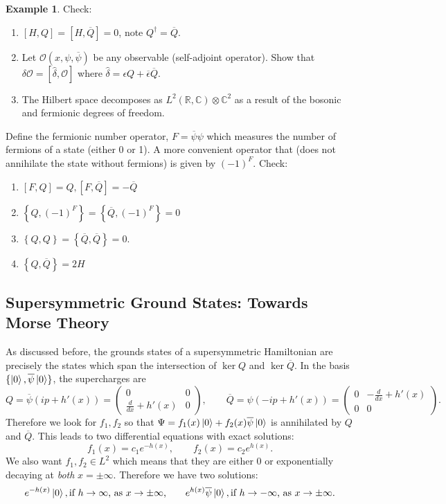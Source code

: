 \documentclass{report}
\theoremstyle{plain}
\theoremstyle{definition}
\newtheorem{example}[theorem]{Example}
\theoremstyle{remark}
\newcommand{\bC}{\mathbb{C}}
\newcommand{\bR}{\mathbb{R}}
\newcommand{\mc}{\mathcal}
\newcommand{\cnj}{\overline}
\newcommand{\ten}{\otimes}
\newcommand{\FR}[2]{\frac{#1}{#2}}
\begin{document}
\begin{example}
Check:
\begin{enumerate}
    \item $[H,Q]=[H,\cnj Q] = 0$, note $Q^\dagger = \cnj Q$.
    \item Let $\mc O(x,\psi,\cnj\psi)$ be any observable (self-adjoint
        operator). Show that $\delta \mc O = [\hat\delta,\mc O]$ where
        $\hat\delta = \epsilon Q+\cnj\epsilon\cnj Q$.
    \item The Hilbert space decomposes as $L^2(\bR,\bC)\ten\bC^2$ as a
        result of the bosonic and fermionic degrees of freedom.
\end{enumerate}
Define the fermionic number operator, $F = \cnj\psi\psi$ which measures the
number of fermions of a state (either 0 or 1). A more convenient operator
that (does not annihilate the state without fermions) is given by $(-1)^F$.
Check:
\begin{enumerate}
    \item $[F,Q]=Q, [F,\cnj Q]=-\cnj Q$
    \item $\left\{ Q,(-1)^F \right\}=\left\{ \cnj Q,(-1)^F \right\}=0$
    \item $\left\{ Q,Q \right\}=\left\{ \cnj Q,\cnj Q \right\}=0$.
    \item $\left\{ Q,\cnj Q \right\} = 2H$
\end{enumerate}
\end{example}
\subsection{Supersymmetric Ground States: Towards Morse Theory}
As discussed before, the grounds states of a supersymmetric Hamiltonian are
precisely the states which span the intersection of $\ker Q$ and $\ker\cnj
Q$. In the basis $\{\ket 0, \cnj\psi\ket0\}$, the supercharges are
\[Q=\cnj\psi(ip+h'(x))=\begin{pmatrix}0&0\\\FR{d}{dx}+h'(x)&0\end{pmatrix},\qquad
\cnj Q=\psi(-ip+h'(x))=\begin{pmatrix}0&-\FR{d}{dx}+h'(x)\\0&0\end{pmatrix}.\]
Therefore we look for $f_1,f_2$ so that $\Psi= f_1(x) \ket0 + f_2(x)
\cnj\psi\ket0$ is annihilated by $Q$ and $\cnj Q$. This leads to two
differential equations with exact solutions: \[f_1(x)=c_1e^{-h(x)},\qquad
f_2(x)=c_2 e^{h(x)}.\] We also want $f_1,f_2 \in L^2$ which means that
they are either $0$ or exponentially decaying at \emph{both} $x=\pm\infty$.
Therefore we have two solutions:
\[ e^{-h(x)}\ket 0, \text{if $h\to\infty$, as $x\to\pm\infty$,}\qquad
e^{h(x)}\cnj\psi\ket 0, \text{if $h\to-\infty$, as $x\to\pm\infty$.}\]
\end{document}
